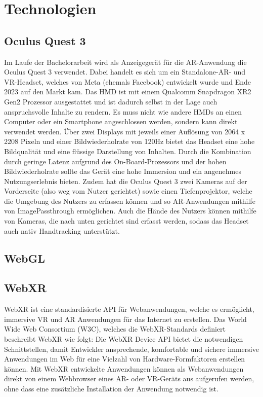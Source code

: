 \chapter{Technologien}

\section{Oculus Quest 3}

Im Laufe der Bachelorarbeit wird als Anzeigegerät für die AR-Anwendung die Oculus Quest 3 verwendet.
Dabei handelt es sich um ein Standalone-AR- und VR-Headset, welches von Meta (ehemals Facebook) entwickelt wurde und Ende 2023 auf den Markt kam.
Das HMD ist mit einem Qualcomm Snapdragon XR2 Gen2 Prozessor ausgestattet und ist dadurch selbst in der Lage auch anspruchsvolle Inhalte zu rendern.
Es muss nicht wie andere HMDs an einen Computer oder ein Smartphone angeschlossen werden, sondern kann direkt verwendet werden.
Über zwei Displays mit jeweils einer Auflösung von 2064 x 2208 Pixeln und einer Bildwiederholrate von 120Hz bietet das Headset eine hohe Bildqualität und eine flüssige Darstellung von Inhalten.
Durch die Kombination durch geringe Latenz aufgrund des On-Board-Prozessors und der hohen Bildwiederholrate sollte das Gerät eine hohe Immersion und ein angenehmes Nutzungserlebnis bieten.
Zudem hat die Oculus Quest 3 zwei Kameras auf der Vorderseite (also weg vom Nutzer gerichtet) sowie einen Tiefenprojektor, welche die Umgebung des Nutzers zu erfassen können und so AR-Anwendungen mithilfe von ImagePassthrough ermöglichen.
Auch die Hände des Nutzers können mithilfe von Kameras, die nach unten gerichtet sind erfasst werden, sodass das Headset auch nativ Handtracking unterstützt.
\autocite[]{meta-quest-3}


\section{WebGL}

\section{WebXR}

WebXR ist eine standardisierte API für Webanwendungen, welche es ermöglicht, immersive VR und AR Anwendungen für das Internet zu erstellen.
Das World Wide Web Consortium (W3C), welches die WebXR-Standards definiert beschreibt WebXR wie folgt: \glqq{}Die WebXR Device API bietet die notwendigen Schnittstellen, damit Entwickler ansprechende, komfortable und sichere immersive Anwendungen im Web für eine Vielzahl von Hardware-Formfaktoren erstellen können.\grqq{} \autocite[aus dem Englischen mit DeepL ][1. Introduction]{w3c_webxr}
Mit WebXR entwickelte Anwendungen können als Webanwendungen direkt von einem Webbrowser eines AR- oder VR-Geräts aus aufgerufen werden, ohne dass eine zusätzliche Installation der Anwendung notwendig ist.


